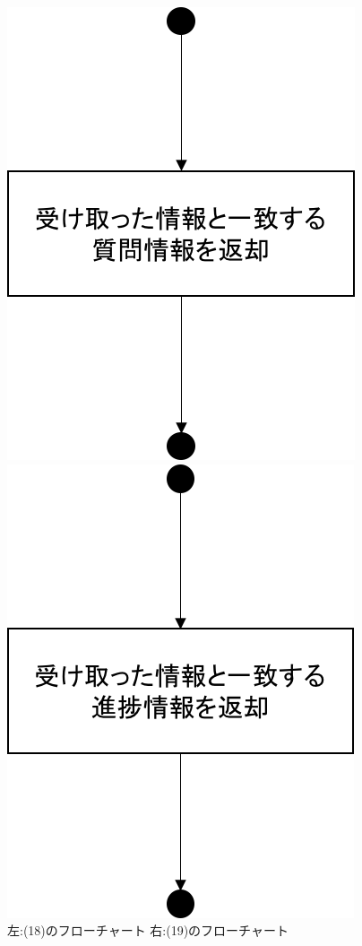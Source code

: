 \begin{figure}[htbp]
 \begin{minipage}{0.5\hsize}
  \begin{center}
   \includegraphics[width=0.5\linewidth,clip]{./img/flow/18.png}
  \end{center}
 \end{minipage}
 \begin{minipage}{0.5\hsize}
  \begin{center}
   \includegraphics[width=0.5\linewidth,clip]{./img/flow/19.png}
  \end{center}
 \end{minipage}
 \caption{左:(18)のフローチャート 右:(19)のフローチャート}\label{fig:18to19}
\end{figure}

